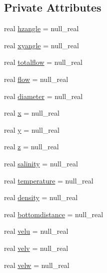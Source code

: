 \subsection*{Private Attributes}
\begin{DoxyCompactItemize}
\item 
real \mbox{\hyperlink{structmodulejet_1_1t__port_a1669f8a3e91d00896c3c027605882939}{hzangle}} = null\+\_\+real
\item 
real \mbox{\hyperlink{structmodulejet_1_1t__port_aaf74643bd2a5e57a81e103e0d03ea695}{xyangle}} = null\+\_\+real
\item 
real \mbox{\hyperlink{structmodulejet_1_1t__port_a5ccaacbf7343d45ee8988519f92aef82}{totalflow}} = null\+\_\+real
\item 
real \mbox{\hyperlink{structmodulejet_1_1t__port_a0f033d1663e0d502723734d31433a77a}{flow}} = null\+\_\+real
\item 
real \mbox{\hyperlink{structmodulejet_1_1t__port_a98413ce7c9d72f0be9fff2082a4d1bba}{diameter}} = null\+\_\+real
\item 
real \mbox{\hyperlink{structmodulejet_1_1t__port_a20477613ee0461483593dbd69ab9a5e0}{x}} = null\+\_\+real
\item 
real \mbox{\hyperlink{structmodulejet_1_1t__port_a3e73f408325c4081ff825d52579da7d8}{y}} = null\+\_\+real
\item 
real \mbox{\hyperlink{structmodulejet_1_1t__port_a5b77804eb9cc78ecb0631487bd5464ea}{z}} = null\+\_\+real
\item 
real \mbox{\hyperlink{structmodulejet_1_1t__port_a6aaf0f401455f0d63ef23ba54af0df63}{salinity}} = null\+\_\+real
\item 
real \mbox{\hyperlink{structmodulejet_1_1t__port_a3740120af05e711b5a818b244f701ced}{temperature}} = null\+\_\+real
\item 
real \mbox{\hyperlink{structmodulejet_1_1t__port_ac4f9e11fa194e83f68745db771389179}{density}} = null\+\_\+real
\item 
real \mbox{\hyperlink{structmodulejet_1_1t__port_a9c284c9e4765b05a51ec01f3b4a5ef15}{bottomdistance}} = null\+\_\+real
\item 
real \mbox{\hyperlink{structmodulejet_1_1t__port_a6db37d00c637457b20d65383e0c1fc03}{velu}} = null\+\_\+real
\item 
real \mbox{\hyperlink{structmodulejet_1_1t__port_a047360c4368b68c0f1753da9b5acaea5}{velv}} = null\+\_\+real
\item 
real \mbox{\hyperlink{structmodulejet_1_1t__port_a1543b7bb826f39019e0bfea9d48b1bc0}{velw}} = null\+\_\+real

\end{DoxyCompactItemize}

